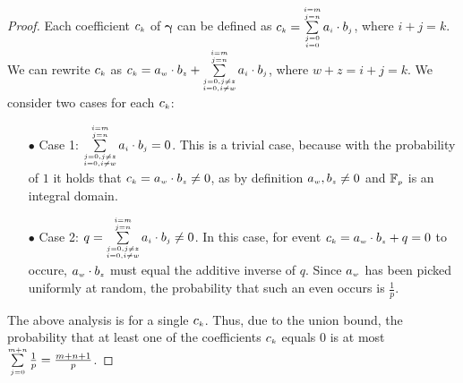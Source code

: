 \begin{proof}
Each coefficient $c_{\scriptscriptstyle  k}$ of $\bm\gamma$ can be defined as $c_{\scriptscriptstyle  k}=\sum\limits_{\substack{\scriptscriptstyle j=0\\ \scriptscriptstyle i=0}}^{\substack{\scriptscriptstyle i=m\\ \scriptscriptstyle j=n}}a_{\scriptscriptstyle i}\cdot b_{\scriptscriptstyle j}$, where $i+j=k$. We can rewrite $c_{\scriptscriptstyle  k}$ as  $c_{\scriptscriptstyle  k}=a_{\scriptscriptstyle w}\cdot b_{\scriptscriptstyle z}+ \sum\limits_{\substack{\scriptscriptstyle j=0, j\neq z\\ \scriptscriptstyle i=0, i\neq w}}^{\substack{\scriptscriptstyle i=m\\ \scriptscriptstyle j=n}}a_{\scriptscriptstyle i}\cdot b_{\scriptscriptstyle j}$, where $w+z=i+j=k$. 
%
We consider two cases for each $c_{\scriptscriptstyle  k}$:

\begin{itemize}

\item[$\bullet$]  {Case 1}: $\sum\limits_{\substack{\scriptscriptstyle j=0, j\neq z\\ \scriptscriptstyle i=0, i\neq w}}^{\substack{\scriptscriptstyle i=m\\ \scriptscriptstyle j=n}}a_{\scriptscriptstyle i}\cdot b_{\scriptscriptstyle j}=0$.  This is a trivial case, because with the  probability of $1$ it holds that $c_{\scriptscriptstyle  k}=a_{\scriptscriptstyle w}\cdot b_{\scriptscriptstyle z}\neq 0$, as by  definition $a_{\scriptscriptstyle w}, b_{\scriptscriptstyle z}\neq0$ and $\mathbb{F}_{\scriptscriptstyle p}$ is an integral domain. 


%




\item[$\bullet$]  {Case 2}: $q=\sum\limits_{\substack{\scriptscriptstyle j=0, j\neq z\\ \scriptscriptstyle i=0, i\neq w}}^{\substack{\scriptscriptstyle i=m\\ \scriptscriptstyle j=n}}a_{\scriptscriptstyle i}\cdot b_{\scriptscriptstyle j}\neq 0$. In this case, for  event $c_{\scriptscriptstyle  k}=a_{\scriptscriptstyle w}\cdot b_{\scriptscriptstyle z}+q=0$ to occure, $a_{\scriptscriptstyle w}\cdot b_{\scriptscriptstyle z}$ must equal the additive inverse of $q$. Since $a_{\scriptscriptstyle w}$ has been picked uniformly at random, the probability that such an even occurs is $\frac{1}{p}$.
\end{itemize}

The above analysis is for a single $c_{\scriptscriptstyle  k}$. Thus, due to the union bound, the probability that at least one of the coefficients $c_{\scriptscriptstyle  k}$ equals $0$ is at most $\sum\limits^{\scriptscriptstyle m+n}_{\scriptscriptstyle j=0}\frac{1}{p}= \frac{m+n+1}{p}$.
%
 \end{proof}




